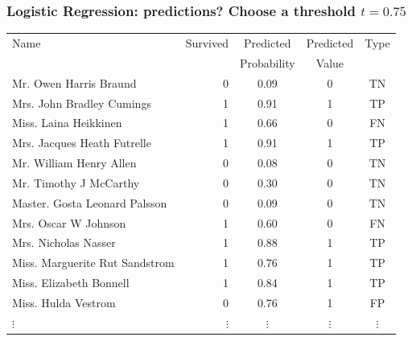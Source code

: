 \documentclass[aspectratio=169]{beamer}
\theoremstyle{principle}
\begin{document}
\begin{frame}
\frametitle{Logistic Regression: predictions?  Choose a threshold $t = 0.75$}

\begin{table}[ht]
\centering
\begin{tabular}{l | r | c | c | c}

 Name & Survived & Predicted & Predicted & Type\\ 
&&Probability&Value\\
  \hline
  \hline
 Mr. Owen Harris Braund &   0 & 0.09 & 0 & TN\\ 
 Mrs. John Bradley Cumings &   1 & 0.91 & 1 & TP\\ 
 Miss. Laina Heikkinen &   1 & 0.66 & 0 & FN\\ 
 Mrs. Jacques Heath Futrelle &   1 & 0.91 & 1 & TP\\ 
 Mr. William Henry Allen &   0 & 0.08 & 0 & TN\\ 
 Mr. Timothy J McCarthy &   0 & 0.30 & 0 & TN\\ 
 Master. Gosta Leonard Palsson &   0 & 0.09 & 0 & TN\\ 
 Mrs. Oscar W Johnson &   1 & 0.60 & 0 & FN\\ 
 Mrs. Nicholas Nasser &   1 & 0.88 & 1 & TP\\ 
 Miss. Marguerite Rut Sandstrom &   1 & 0.76 & 1 &TP\\ 
 Miss. Elizabeth Bonnell &   1 & 0.84 &1 &TP\\ 
 Miss. Hulda Vestrom &   0 & 0.76 &1& FP\\ 
$\vdots$ & $\vdots$ & $\vdots$ & $\vdots$ & $\vdots$
\end{tabular}
\end{table}

\end{frame}
\end{document}
